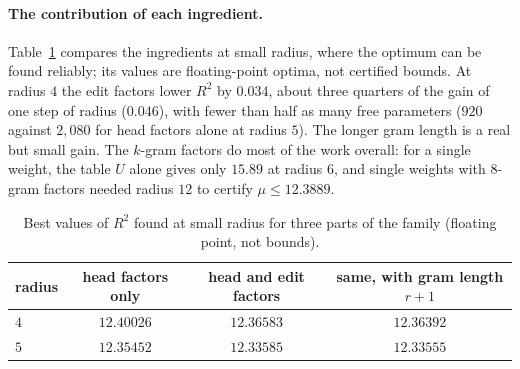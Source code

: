 \paragraph{The contribution of each ingredient.}
Table~\ref{tab:ingredients} compares the ingredients at small radius, where the optimum can be found reliably; its
values are floating-point optima, not certified bounds. At radius $4$ the edit factors lower $R^2$ by $0.034$, about
three quarters of the gain of one step of radius ($0.046$), with fewer than half as many free parameters ($920$
against $2{,}080$ for head factors alone at radius $5$). The longer gram length is a real but small gain. The $k$-gram factors do most of the work overall: for a single
weight, the table $U$ alone gives only $15.89$ at radius $6$, and single weights with $8$-gram factors needed radius
$12$ to certify $\mu\le12.3889$.

\begin{table}[htb]
\centering
\begin{tabular}{lccc}
\toprule
radius & head factors only & head and edit factors & same, with gram length $r+1$ \\
\midrule
$4$ & $12.40026$ & $12.36583$ & $12.36392$\\
$5$ & $12.35452$ & $12.33585$ & $12.33555$\\
\bottomrule
\end{tabular}
\caption{Best values of $R^2$ found at small radius for three parts of the family (floating point, not bounds).}
\label{tab:ingredients}
\end{table}

